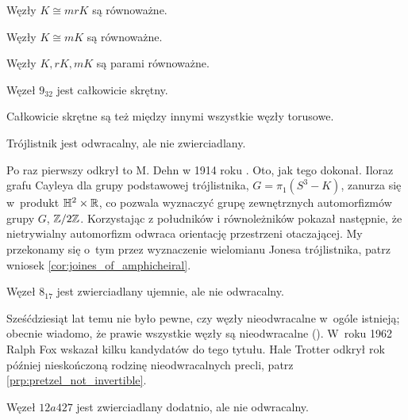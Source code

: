 \begin{definition}
    Węzły $K \cong mrK$ są równoważne. %
\end{definition}

\begin{definition}
    Węzły $K \cong mK$ są równoważne. %
\end{definition}

\begin{definition}
    Węzły $K, rK, mK$ są parami równoważne. %
\end{definition}

\begin{example}
    Węzeł $9_{32}$ jest całkowicie skrętny.
\end{example}

Całkowicie skrętne są też między innymi wszystkie węzły torusowe.

\begin{example}
    \label{exm:trefoil_is_chiral}
    Trójlistnik jest odwracalny, ale nie zwierciadlany.
\end{example}

Po raz pierwszy odkrył to M. Dehn w 1914 roku \cite{dehn14}.
Oto, jak tego dokonał.
Iloraz grafu Cayleya dla grupy podstawowej trójlistnika, $G = \pi_1(S^3 - K)$, zanurza się w~produkt $\mathbb H^2 \times \mathbb R$, co pozwala wyznaczyć grupę zewnętrznych automorfizmów grupy $G$, $\mathbb Z/2\mathbb Z$.
Korzystając z południków i równoleżników pokazał następnie, że nietrywialny automorfizm odwraca orientację przestrzeni otaczającej.
My przekonamy się o~tym przez wyznaczenie wielomianu Jonesa trójlistnika, patrz wniosek \ref{cor:joines_of_amphicheiral}.

\begin{example}
    Węzeł $8_{17}$ jest zwierciadlany ujemnie, ale nie odwracalny.
\end{example}

Sześćdziesiąt lat temu nie było pewne, czy węzły nieodwracalne w~ogóle istnieją; obecnie wiadomo, że prawie wszystkie węzły są nieodwracalne (\cite[s.~46]{murasugi96}).
W~roku 1962 Ralph Fox wskazał kilku kandydatów do tego tytułu.
Hale Trotter odkrył rok później nieskończoną rodzinę nieodwracalnych precli, patrz \ref{prp:pretzel_not_invertible}.

\begin{example}
    Węzeł $12a427$ jest zwierciadlany dodatnio, ale nie odwracalny.
\end{example}

